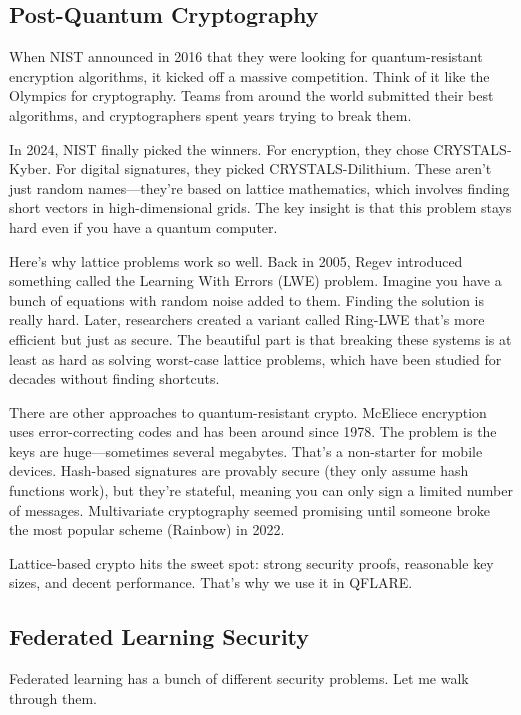 \documentclass[journal,onecolumn]{IEEEtran}
\begin{document}
\subsection{Post-Quantum Cryptography}

When NIST announced in 2016 that they were looking for quantum-resistant encryption algorithms, it kicked off a massive competition. Think of it like the Olympics for cryptography. Teams from around the world submitted their best algorithms, and cryptographers spent years trying to break them.

In 2024, NIST finally picked the winners. For encryption, they chose CRYSTALS-Kyber. For digital signatures, they picked CRYSTALS-Dilithium. These aren't just random names---they're based on lattice mathematics, which involves finding short vectors in high-dimensional grids. The key insight is that this problem stays hard even if you have a quantum computer.

Here's why lattice problems work so well. Back in 2005, Regev introduced something called the Learning With Errors (LWE) problem. Imagine you have a bunch of equations with random noise added to them. Finding the solution is really hard. Later, researchers created a variant called Ring-LWE that's more efficient but just as secure. The beautiful part is that breaking these systems is at least as hard as solving worst-case lattice problems, which have been studied for decades without finding shortcuts.

There are other approaches to quantum-resistant crypto. McEliece encryption uses error-correcting codes and has been around since 1978. The problem is the keys are huge---sometimes several megabytes. That's a non-starter for mobile devices. Hash-based signatures are provably secure (they only assume hash functions work), but they're stateful, meaning you can only sign a limited number of messages. Multivariate cryptography seemed promising until someone broke the most popular scheme (Rainbow) in 2022.

Lattice-based crypto hits the sweet spot: strong security proofs, reasonable key sizes, and decent performance. That's why we use it in QFLARE.

\subsection{Federated Learning Security}

Federated learning has a bunch of different security problems. Let me walk through them.
\end{document}
